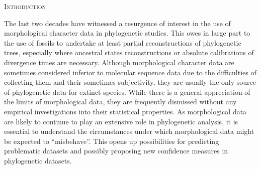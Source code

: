 \documentclass[12pt,letterpaper]{article}
\renewcommand{\section}[1]{%
\bigskip
\begin{center}
\begin{Large}
\normalfont\scshape #1
\medskip
\end{Large}
\end{center}}
\begin{document}
\section{Introduction}
The last two decades have witnessed a resurgence of interest in the use of morphological character data in phylogenetic studies.
This owes in large part to the use of fossils to undertake at least partial reconstructions of phylogenetic trees, especially where ancestral states reconstructions or absolute calibrations of divergence times are necessary. 
Although morphological character data are sometimes considered inferior to molecular sequence data due to the difficulties of collecting them and their sometimes subjectivity, they are usually the only source of phylogenetic data for extinct species.
While there is a general appreciation of the limits of morphological data, they are frequently dismissed without any empirical investigations into their statistical properties.
As morphological data are likely to continue to play an extensive role in phylogenetic analysis, it is essential to understand the circumstances under which morphological data might be expected to ``misbehave''.
This opens up possibilities for predicting problematic datasets and possibly proposing new confidence measures in phylogenetic datasets.
\end{document}

